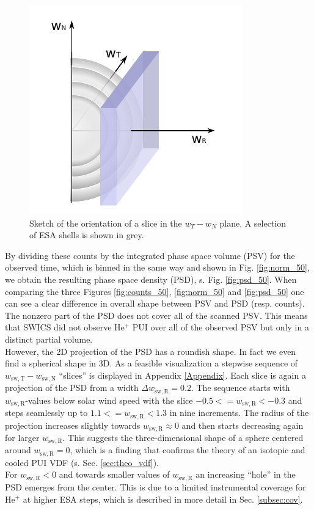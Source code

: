 \begin{figure}[h]
	\includegraphics[width=.5\textwidth]{Figures/sketch_slice_R2.pdf}
	\centering
	\caption{Sketch of the orientation of a slice in the $w_T - w_N$ plane. A selection of ESA shells is shown in grey.}
	\label{fig:sketch_slice_R}
\end{figure}
By dividing these counts by the integrated phase space volume (PSV) for the observed time, which is binned in the same way and shown in Fig. \ref{fig:norm_50}, we obtain the resulting phase space density (PSD), s. Fig. \ref{fig:psd_50}. When comparing the three Figures \ref{fig:counts_50}, \ref{fig:norm_50} and \ref{fig:psd_50} one can see a clear difference in overall shape between PSV and PSD (resp. counts). The nonzero part of the PSD does not cover all of the scanned PSV. This means that SWICS did not observe $\mathrm{He^{+}}$ PUI over all of the observed PSV but only in a distinct partial volume.\\ 
However, the 2D projection of the PSD has a roundish shape. In fact we even find a spherical shape in 3D. As a feasible visualization a stepwise sequence of $w_\mathrm{sw,T} - w_\mathrm{sw,N}$ ``slices'' is displayed in Appendix \ref{Appendix}. Each slice is again a projection of the PSD from a width $\Delta w_\mathrm{sw,R} = 0.2$. The sequence starts with $w_\mathrm{sw,R}$-values below solar wind speed with the slice $-0.5 <= w_\mathrm{sw,R} < -0.3$ and steps seamlessly up to $1.1 <= w_\mathrm{sw,R} < 1.3$ in nine increments. The radius of the projection increases slightly towards $ w_\mathrm{sw,R} \approx 0$ and then starts decreasing again for larger $w_\mathrm{sw,R}$. This suggests the three-dimensional shape of a sphere centered around $w_\mathrm{sw,R} = 0$, which is a finding that confirms the theory of an isotopic and cooled PUI VDF (s. Sec. \ref{sec:theo_vdf}). \\
For $w_\mathrm{sw,R} < 0$ and towards smaller values of $w_\mathrm{sw,R}$ an increasing ``hole'' in the PSD emerges from the center. This is due to a limited instrumental coverage for $\mathrm{He^{+}}$ at higher ESA steps, which is described in more detail in Sec. \ref{subsec:cov}. \\
